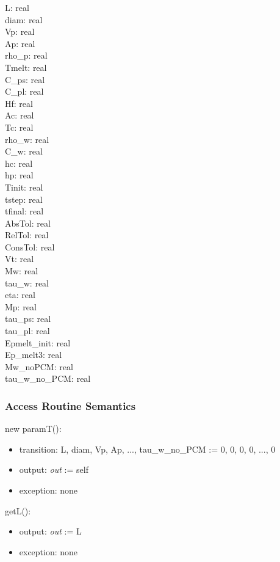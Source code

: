 \documentclass[12pt]{article}
\begin{document}
L: real \\
diam: real \\
Vp: real \\
Ap: real \\
rho\_p: real \\
Tmelt: real \\
C\_ps: real \\
C\_pl: real \\
Hf: real \\
Ac: real \\
Tc: real \\
rho\_w: real \\
C\_w: real \\
hc: real \\
hp: real \\
Tinit: real \\
tstep: real \\
tfinal: real \\
AbsTol: real \\
RelTol: real \\
ConsTol: real \\
Vt: real \\
Mw: real \\
tau\_w: real \\
eta: real \\
Mp: real \\
tau\_ps: real \\
tau\_pl: real \\
Epmelt\_init: real \\
Ep\_melt3: real \\ 
Mw\_noPCM: real \\
tau\_w\_no\_PCM: real

\subsubsection{Access Routine Semantics}

\noindent new paramT():
\begin{itemize}
\item transition: L, diam,  Vp, Ap, ..., tau\_w\_no\_PCM := 0, 0, 0, 0, ..., 0
\item output: \textit{out} := self
\item exception: none
\end{itemize}

\noindent getL():
\begin{itemize}
\item output: \textit{out} := L
\item exception: none
\end{itemize}
\end{document}
